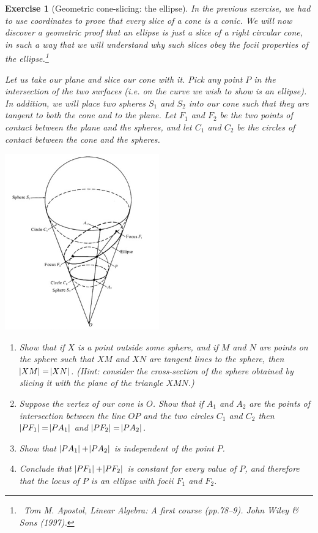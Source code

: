\documentclass[a4paper,leqno,10pt]{article}
\theoremstyle{exercise}
\newtheorem{Exercise}{Exercise}
\newenvironment{exercise}
  {\begin{mdframed}\begin{Exercise}}
  {\end{Exercise}\end{mdframed}}
\theoremstyle{plain}
\theoremstyle{definition}
\theoremstyle{remark}
\begin{document}
\begin{exercise}[Geometric cone-slicing: the ellipse]
  In the previous exercise, we had to use coordinates to prove that every slice of a cone is a conic. We will now
  discover a geometric proof that an ellipse is just a slice of a right circular cone, in such a way that we will
  understand why such slices obey the focii properties of the ellipse.\footnote{~Tom M. Apostol, \emph{Linear Algebra: A first course} (pp.78--9). John Wiley \& Sons (1997).}

  Let us take our plane and slice our cone with it. Pick any point $ P $ in the intersection of the two surfaces (i.e.
  on the curve we wish to show is an ellipse). In addition, we will place two spheres $ S_1 $ and $ S_2 $ into our cone
  such that they are tangent to both the cone and to the plane. Let $ F_1 $ and $ F_2 $ be the two points of contact between
  the plane and the spheres, and let $ C_1 $ and $ C_2 $ be the circles of contact between the cone and the spheres.

  \begin{center}
    \includegraphics[width=0.5\textwidth]{apostol}
  \end{center}

  \begin{enumerate}
    \item Show that if $ X $ is a point outside some sphere, and if $ M $ and $ N $ are points on the sphere such that $ XM $
          and $ XN $ are tangent lines to the sphere, then $ \abs{XM} = \abs{XN} $. (Hint: consider the cross-section of the sphere
          obtained by slicing it with the plane of the triangle $ XMN $.)
    \item Suppose the vertex of our cone is $ O $. Show that if $ A_1 $ and $ A_2 $ are the points of intersection
          between the line $ OP $ and the two circles $ C_1 $ and $ C_2 $ then $ \abs{PF_1} = \abs{PA_1} $ and $ \abs{PF_2} = \abs{PA_2} $.
    \item Show that $ \abs{PA_1} + \abs{PA_2} $ is independent of the point $ P $.
    \item Conclude that $ \abs{PF_1} + \abs{PF_2} $ is constant for every value of $ P $, and therefore that the locus of $ P $
          is an ellipse with focii $ F_1 $ and $ F_2 $.
  \end{enumerate}
\end{exercise}
\end{document}
